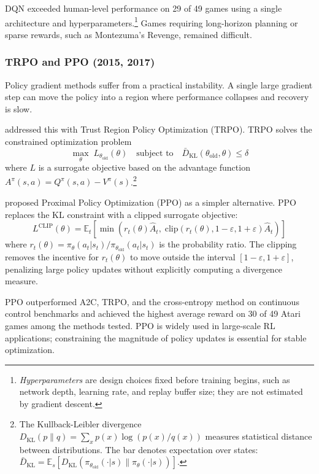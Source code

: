 DQN exceeded human-level performance on 29 of 49 games using a single architecture and hyperparameters.\footnote{\emph{Hyperparameters} are design choices fixed before training begins, such as network depth, learning rate, and replay buffer size; they are not estimated by gradient descent.} Games requiring long-horizon planning or sparse rewards, such as Montezuma's Revenge, remained difficult.

\subsubsection{TRPO and PPO (2015, 2017)}

Policy gradient methods suffer from a practical instability. A single large gradient step can move the policy into a region where performance collapses and recovery is slow.

\citet{Schulman2015} addressed this with Trust Region Policy Optimization (TRPO). TRPO solves the constrained optimization problem
\begin{equation}
\max_\theta \; L_{\theta_{\text{old}}}(\theta) \quad \text{subject to} \quad \bar{D}_{\mathrm{KL}}(\theta_{\text{old}}, \theta) \leq \delta
\end{equation}
where $L$ is a surrogate objective based on the advantage function $A^\pi(s,a) = Q^\pi(s,a) - V^\pi(s)$.\footnote{The Kullback-Leibler divergence $D_{\mathrm{KL}}(p \| q) = \sum_x p(x) \log(p(x)/q(x))$ measures statistical distance between distributions. The bar denotes expectation over states: $\bar{D}_{\mathrm{KL}} = \mathbb{E}_{s}[D_{\mathrm{KL}}(\pi_{\theta_{\text{old}}}(\cdot|s) \| \pi_\theta(\cdot|s))]$.}

\citet{Schulman2017} proposed Proximal Policy Optimization (PPO) as a simpler alternative. PPO replaces the KL constraint with a clipped surrogate objective:
\begin{equation}
L^{\text{CLIP}}(\theta) = \mathbb{E}_t \left[ \min\!\left( r_t(\theta) \hat{A}_t, \; \text{clip}(r_t(\theta), 1-\varepsilon, 1+\varepsilon) \hat{A}_t \right) \right]
\end{equation}
where $r_t(\theta) = \pi_\theta(a_t|s_t) / \pi_{\theta_{\text{old}}}(a_t|s_t)$ is the probability ratio. The clipping removes the incentive for $r_t(\theta)$ to move outside the interval $[1-\varepsilon, 1+\varepsilon]$, penalizing large policy updates without explicitly computing a divergence measure.

PPO outperformed A2C, TRPO, and the cross-entropy method on continuous control benchmarks and achieved the highest average reward on 30 of 49 Atari games among the methods tested. PPO is widely used in large-scale RL applications; constraining the magnitude of policy updates is essential for stable optimization.

